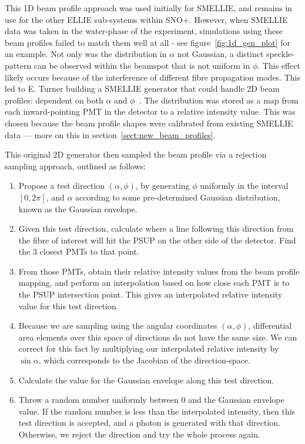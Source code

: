 This 1D beam profile approach was used initially for SMELLIE, and remains in use for the other ELLIE sub-systems within SNO+. However, when SMELLIE data was taken in the water-phase of the experiment, simulations using these beam profiles failed to match them well at all - see figure~\ref{fig:1d_gen_plot} for an example. Not only was the distribution in $\alpha$ not Gaussian, a distinct speckle-pattern can be observed within the beamspot that is not uniform in $\phi$. This effect likely occurs because of the interference of different fibre propagation modes. This led to E. Turner building a SMELLIE generator that could handle 2D beam profiles: dependent on both $\alpha$ and $\phi$~\cite{turnerMeasurementScatteringCharacteristics2022}. The distribution was stored as a map from each inward-pointing PMT in the detector to a relative intensity value. This was chosen because the beam profile shapes were calibrated from existing SMELLIE data --- more on this in section~\ref{sect:new_beam_profiles}.

This original 2D generator then sampled the beam profile via a rejection sampling approach, outlined as follows:
\begin{enumerate}
    \item Propose a test direction $(\alpha, \phi)$, by generating $\phi$ uniformly in the interval $[0, 2\pi]$, and $\alpha$ according to some pre-determined Gaussian distribution, known as the Gaussian envelope.
    \item Given this test direction, calculate where a line following this direction from the fibre of interest will hit the PSUP on the other side of the detector. Find the 3 closest PMTs to that point.
    \item From those PMTs, obtain their relative intensity values from the beam profile mapping, and perform an interpolation based on how close each PMT is to the PSUP intersection point. This gives an interpolated relative intensity value for this test direction.
    \item Because we are sampling using the angular coordinates $(\alpha, \phi)$, differential area elements over this space of directions do not have the same size. We can correct for this fact by multiplying our interpolated relative intensity by $\sin{\alpha}$, which corresponds to the Jacobian of the direction-space.
    \item Calculate the value for the Gaussian envelope along this test direction.
    \item Throw a random number uniformly between 0 and the Gaussian envelope value. If the random number is less than the interpolated intensity, then this test direction is accepted, and a photon is generated with that direction. Otherwise, we reject the direction and try the whole process again.
\end{enumerate}

